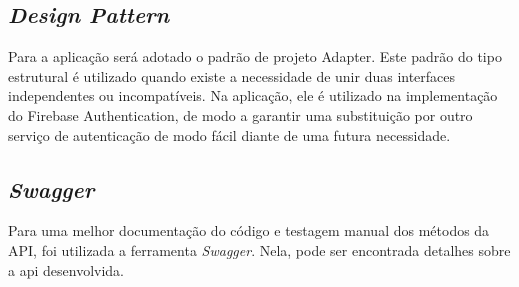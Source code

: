 \subsection{\textit{Design Pattern}}
Para a aplicação será adotado o padrão de projeto Adapter. Este padrão do tipo estrutural é utilizado quando existe a necessidade de unir duas interfaces independentes ou incompatíveis. Na aplicação, ele é utilizado na implementação do Firebase Authentication, de modo a garantir uma substituição por outro serviço de autenticação de modo fácil diante de uma futura necessidade.

\subsection{\textit{Swagger}}
Para uma melhor documentação do código e testagem manual dos métodos da API, foi utilizada a ferramenta \textit{Swagger}. Nela, pode ser encontrada detalhes sobre a \ac{api} desenvolvida.


